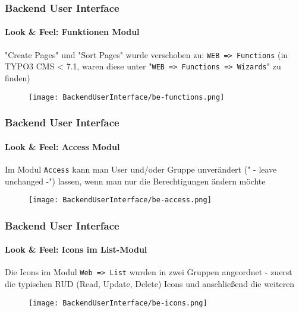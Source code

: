 \begin{frame}[fragile]
	\frametitle{Backend User Interface}
	\framesubtitle{Look \& Feel: Funktionen Modul}

	"Create Pages" und "Sort Pages" wurde verschoben zu: \texttt{WEB => Functions}\newline
	\smaller (in TYPO3 CMS < 7.1, waren diese unter "\texttt{WEB => Functions => Wizards}" zu finden) 

	\begin{figure}
		\texttt{[image: BackendUserInterface/be-functions.png]}
	\end{figure}

\end{frame}



\begin{frame}[fragile]
	\frametitle{Backend User Interface}
	\framesubtitle{Look \& Feel: Access Modul}

 	Im Modul \texttt{Access} kann man User und/oder Gruppe unverändert (" - leave unchanged -") lassen, wenn man nur die Berechtigungen ändern möchte

	\begin{figure}
		\texttt{[image: BackendUserInterface/be-access.png]}
	\end{figure}

\end{frame}


\begin{frame}[fragile]
	\frametitle{Backend User Interface}
	\framesubtitle{Look \& Feel: Icons im List-Modul}

	Die Icons im Modul \texttt{Web => List} wurden in zwei Gruppen angeordnet - zuerst die typischen RUD (Read, Update, Delete) Icons und anschließend die weiteren

	\begin{figure}
		\texttt{[image: BackendUserInterface/be-icons.png]}
	\end{figure}

\end{frame}
